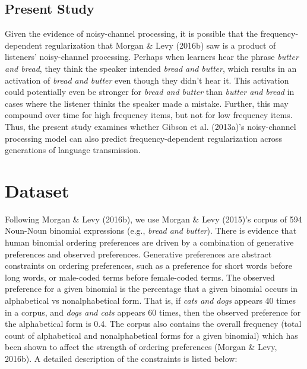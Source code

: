 \documentclass[10pt, letterpaper]{article}
\begin{document}
\hypertarget{present-study}{%
\subsection{Present Study}\label{present-study}}

Given the evidence of noisy-channel processing, it is possible that the
frequency-dependent regularization that Morgan \& Levy (2016b) saw is a
product of listeners' noisy-channel processing. Perhaps when learners
hear the phrase \emph{butter and bread}, they think the speaker intended
\emph{bread and butter}, which results in an activation of \emph{bread
and butter} even though they didn't hear it. This activation could
potentially even be stronger for \emph{bread and butter} than
\emph{butter and bread} in cases where the listener thinks the speaker
made a mistake. Further, this may compound over time for high frequency
items, but not for low frequency items. Thus, the present study examines
whether Gibson et al. (2013a)'s noisy-channel processing model can also
predict frequency-dependent regularization across generations of
language transmission.

\hypertarget{dataset}{%
\section{Dataset}\label{dataset}}

Following Morgan \& Levy (2016b), we use Morgan \& Levy (2015)'s corpus
of 594 Noun-Noun binomial expressions (e.g., \emph{bread and butter}).
There is evidence that human binomial ordering preferences are driven by
a combination of generative preferences and observed preferences.
Generative preferences are abstract constraints on ordering preferences,
such as a preference for short words before long words, or male-coded
terms before female-coded terms. The observed preference for a given
binomial is the percentage that a given binomial occurs in alphabetical
vs nonalphabetical form. That is, if \emph{cats and dogs} appears 40
times in a corpus, and \emph{dogs and cats} appears 60 times, then the
observed preference for the alphabetical form is 0.4. The corpus also
contains the overall frequency (total count of alphabetical and
nonalphabetical forms for a given binomial) which has been shown to
affect the strength of ordering preferences (Morgan \& Levy, 2016b). A
detailed description of the constraints is listed below:
\end{document}
